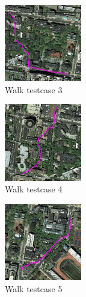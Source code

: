 \documentclass[letterpaper,twocolumn,10pt]{article}
\begin{document}
\begin{figure}[h]
    \centering
    \includegraphics[width=0.3\textwidth]{results/test_walk3.jpg}
    \caption{Walk testcase 3}
\end{figure}

\begin{figure}[h]
    \centering
    \includegraphics[width=0.3\textwidth]{results/test_walk4.jpg}
    \caption{Walk testcase 4}
\end{figure}

\begin{figure}[h]
    \centering
    \includegraphics[width=0.3\textwidth]{results/test_walk5.jpg}
    \caption{Walk testcase 5}
\end{figure}


\end{document}

